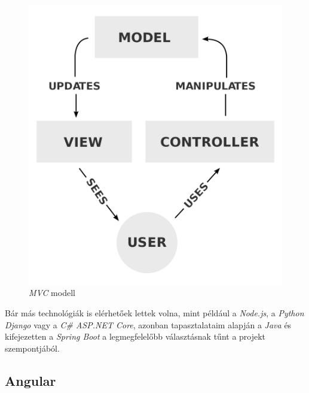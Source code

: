 \begin{figure}[h]
\centering
\includegraphics[scale=0.15]{images/MVC.png}
\caption{\textit{MVC} modell \cite{mvc}}
\label{fig:mvc}
\end{figure}

Bár más technológiák is elérhetőek lettek volna, mint például a \textit{Node.js}, a \textit{Python} \textit{Django} vagy a \textit{C\# ASP.NET Core},  azonban tapasztalataim alapján a \textit{Java} \cite{java} és kifejezetten a \textit{Spring Boot} \cite{spring_boot} a legmegfelelőbb választásnak tűnt a projekt szempontjából.

\subsection{Angular}


